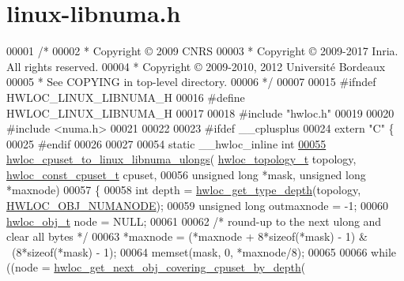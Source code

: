 \hypertarget{a00143_source}{}\section{linux-\/libnuma.h}
\label{a00143_source}

\begin{DoxyCode}
00001 \textcolor{comment}{/*}
00002 \textcolor{comment}{ * Copyright © 2009 CNRS}
00003 \textcolor{comment}{ * Copyright © 2009-2017 Inria.  All rights reserved.}
00004 \textcolor{comment}{ * Copyright © 2009-2010, 2012 Université Bordeaux}
00005 \textcolor{comment}{ * See COPYING in top-level directory.}
00006 \textcolor{comment}{ */}
00007 
00015 \textcolor{preprocessor}{#ifndef HWLOC\_LINUX\_LIBNUMA\_H}
00016 \textcolor{preprocessor}{#define HWLOC\_LINUX\_LIBNUMA\_H}
00017 
00018 \textcolor{preprocessor}{#include "hwloc.h"}
00019 
00020 \textcolor{preprocessor}{#include <numa.h>}
00021 
00022 
00023 \textcolor{preprocessor}{#ifdef \_\_cplusplus}
00024 \textcolor{keyword}{extern} \textcolor{stringliteral}{"C"} \{
00025 \textcolor{preprocessor}{#endif}
00026 
00027 
00054 \textcolor{keyword}{static} \_\_hwloc\_inline \textcolor{keywordtype}{int}
\hyperlink{a00215_gae577962390f84b0b12f503314ab0f972}{00055} \hyperlink{a00215_gae577962390f84b0b12f503314ab0f972}{hwloc\_cpuset\_to\_linux\_libnuma\_ulongs}(
      \hyperlink{a00186_ga9d1e76ee15a7dee158b786c30b6a6e38}{hwloc\_topology\_t} topology, \hyperlink{a00183_ga1f784433e9b606261f62d1134f6a3b25}{hwloc\_const\_cpuset\_t} cpuset,
00056                                     \textcolor{keywordtype}{unsigned} \textcolor{keywordtype}{long} *mask, \textcolor{keywordtype}{unsigned} \textcolor{keywordtype}{long} *maxnode)
00057 \{
00058   \textcolor{keywordtype}{int} depth = \hyperlink{a00187_ga8bec782e21be313750da70cf7428b374}{hwloc\_get\_type\_depth}(topology, 
      \hyperlink{a00184_ggacd37bb612667dc437d66bfb175a8dc55a9d917a3e5497950c6d8948b8e183db5a}{HWLOC\_OBJ\_NUMANODE});
00059   \textcolor{keywordtype}{unsigned} \textcolor{keywordtype}{long} outmaxnode = -1;
00060   \hyperlink{a00238}{hwloc\_obj\_t} node = NULL;
00061 
00062   \textcolor{comment}{/* round-up to the next ulong and clear all bytes */}
00063   *maxnode = (*maxnode + 8*\textcolor{keyword}{sizeof}(*mask) - 1) & ~(8*\textcolor{keyword}{sizeof}(*mask) - 1);
00064   memset(mask, 0, *maxnode/8);
00065 
00066   \textcolor{keywordflow}{while} ((node = \hyperlink{a00196_gaba4b6d86eba1169ced4b0e941d2bb5f0}{hwloc\_get\_next\_obj\_covering\_cpuset\_by\_depth}(

\end{DoxyCode}
